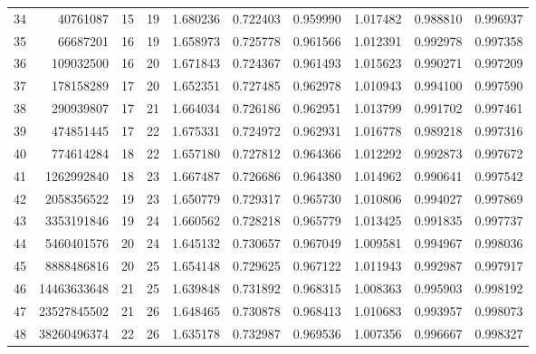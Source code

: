 \documentclass[12pt]{amsart}
\begin{document}
\begin{table}
{\begin{tabular}{|r|rrrrrrrrr|}
\\
34 &40761087 
& 15
& 19
&  1.680236 & 0.722403 &0.959990	
& 1.017482 & 0.988810 &0.996937	

\\
35 &66687201 
& 16
& 19
&  1.658973 & 0.725778 &0.961566	
& 1.012391 & 0.992978 &0.997358	

\\
36 &109032500 
& 16
& 20
&  1.671843 & 0.724367 &0.961493	
& 1.015623 & 0.990271 &0.997209	

\\
37 &178158289 
& 17
& 20
&  1.652351 & 0.727485 &0.962978	
& 1.010943 & 0.994100 &0.997590	

\\
38 &290939807 
& 17
& 21
&  1.664034 & 0.726186 &0.962951	
& 1.013799 & 0.991702 &0.997461	

\\
39 &474851445 
& 17
& 22
&  1.675331 & 0.724972 &0.962931	
& 1.016778 & 0.989218 &0.997316	

\\
40 &774614284 
& 18
& 22
&  1.657180 & 0.727812 &0.964366	
& 1.012292 & 0.992873 &0.997672	

\\
41 &1262992840 
& 18
& 23
&  1.667487 & 0.726686 &0.964380	
& 1.014962 & 0.990641 &0.997542	

\\
42 &2058356522 
& 19
& 23
&  1.650779 & 0.729317 &0.965730	
& 1.010806 & 0.994027 &0.997869	

\\
43 &3353191846 
& 19
& 24
&  1.660562 & 0.728218 &0.965779	
& 1.013425 & 0.991835 &0.997737	

\\
44 &5460401576 
& 20
& 24
&  1.645132 & 0.730657 &0.967049	
& 1.009581 & 0.994967 &0.998036	

\\
45 &8888486816 
& 20
& 25
&  1.654148 & 0.729625 &0.967122	
& 1.011943 & 0.992987 &0.997917	

\\
46 &14463633648 
& 21
& 25
&  1.639848 & 0.731892 &0.968315	
& 1.008363 & 0.995903 &0.998192	

\\
47 &23527845502 
& 21
& 26
&  1.648465 & 0.730878 &0.968413	
& 1.010683 & 0.993957 &0.998073	

\\
48 &38260496374 
& 22
& 26
&  1.635178 & 0.732987 &0.969536	
& 1.007356 & 0.996667 &0.998327	


\end{tabular}}
\end{table}
\end{document}
